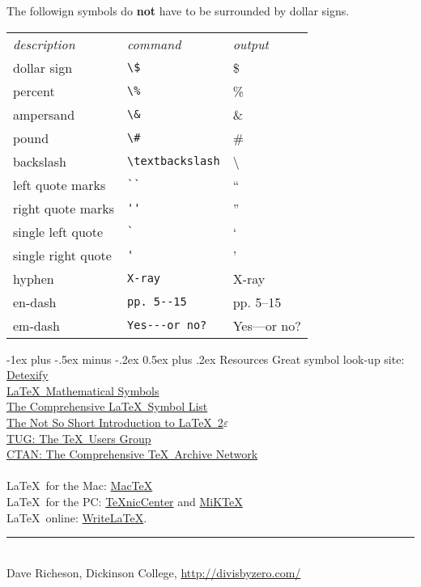 \documentclass[10pt,landscape]{article}
\makeatletter
\renewcommand{\section}{\@startsection{section}{1}{0mm}%
                                {-1ex plus -.5ex minus -.2ex}%
                                {0.5ex plus .2ex}%
                                {\normalfont\normalsize\bfseries}}
\makeatother
\begin{document}
\begin{multicols}{3}
The followign symbols do \textbf{not} have to be surrounded by dollar signs.

\begin{tabular}{lll}
\emph{description} & \emph{command} & \emph{output}\\
dollar sign & \verb!\$! & \$ \\
percent & \verb!\%! & \% \\
ampersand & \verb!\&! & \& \\
pound & \verb!\#! & \# \\
backslash & \verb!\textbackslash! & \textbackslash \\
left quote marks & \verb!``! & `` \\
right quote marks & \verb!''! & '' \\
single left quote  & \verb!`! & ` \\
single right quote  & \verb!'! & ' \\
hyphen & \verb!X-ray! & X-ray\\
en-dash & \verb!pp. 5--15! & pp. 5--15 \\
em-dash & \verb!Yes---or no?! & Yes---or no? 
\end{tabular}

\section{Resources}
Great symbol look-up site: \href{http://detexify.kirelabs.org/}{Detexify}\\
\href{http://amath.colorado.edu/documentation/LaTeX/Symbols.pdf}{\LaTeX\ Mathematical Symbols}\\
\href{ftp://tug.ctan.org/pub/tex-archive/info/symbols/comprehensive/symbols-letter.pdf}{The Comprehensive \LaTeX\ Symbol List}\\ 
\href{http://mirrors.med.harvard.edu/ctan/info/lshort/english/lshort.pdf}{The Not So Short Introduction to \LaTeX\ 2$\varepsilon$}\\
\href{http://www.tug.org/}{TUG: The \TeX\ Users Group}\\
\href{http://www.ctan.org/}{CTAN: The Comprehensive \TeX\ Archive Network}\\
~\\
\LaTeX\ for the Mac: \href{http://www.tug.org/mactex/}{Mac\TeX}\\
\LaTeX\ for the PC: \href{http://www.texniccenter.org/}{{\TeX}nicCenter} and \href{http://miktex.org/}{MiK\TeX}\\
\LaTeX\ online: \href{http://www.writelatex.com/}{WriteLaTeX}.
\vfill
\hrule
~\\
Dave Richeson, Dickinson College, \href{http://divisbyzero.com/}{http://divisbyzero.com/}
\end{multicols}
\end{document}
